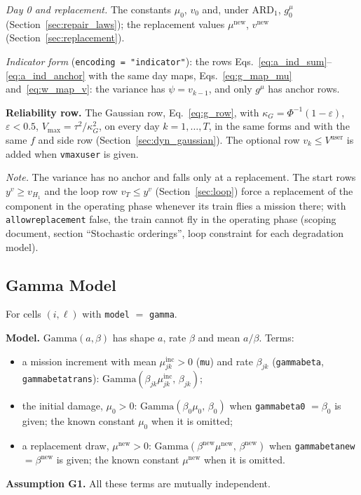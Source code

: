 \documentclass[11pt,a4paper]{article}
\theoremstyle{plain}
\theoremstyle{definition}
\newcommand{\ARDone}{\mathrm{ARD}_{1}}
\newcommand{\inc}{\mathrm{inc}}
\newcommand{\new}{\mathrm{new}}
\renewcommand{\_}{\textunderscore\allowbreak{}}
\begin{document}
\emph{Day 0 and replacement.} The constants $\mu_0$, $v_0$ and, under $\ARDone$,
$g^{\mu}_0$ (Section~\ref{sec:repair_laws}); the replacement values $\mu^{\new}$,
$v^{\new}$ (Section~\ref{sec:replacement}).

\emph{Indicator form} (\texttt{encoding = "indicator"}): the rows
Eqs.~\eqref{eq:a_ind_sum}--\eqref{eq:a_ind_anchor} with the same day maps,
Eqs.~\eqref{eq:g_map_mu} and~\eqref{eq:w_map_v}: the variance has
$\psi = v_{k-1}$, and only $g^{\mu}$ has anchor rows.

\textbf{Reliability row.} The Gaussian row, Eq.~\eqref{eq:g_row}, with
$\kappa_G = \Phi^{-1}(1-\varepsilon)$, $\varepsilon < 0.5$,
$V_{\max} = \tau^2/\kappa_G^2$, on every day $k = 1, \ldots, T$, in the same forms
and with the same $f$ and side row (Section~\ref{sec:dyn_gaussian}). The optional
row $v_k \leq V^{\mathrm{user}}$ is added when \texttt{v\_max\_user} is given.

\emph{Note.} The variance has no anchor and falls only at a replacement. The start rows
$y^v \geq v_{H_1}$ and the loop row $v_T \leq y^v$ (Section~\ref{sec:loop}) force a replacement of the component
in the operating phase whenever its train flies a mission there; with
\texttt{allow\_replacement} false, the train cannot fly in the operating phase
(scoping document, section ``Stochastic orderings'', loop constraint for each
degradation model).

\subsection{Gamma Model}
\label{sec:dyn_gamma}

For cells $(i,\ell)$ with \texttt{model} $=$ \texttt{gamma}.

\textbf{Model.} $\mathrm{Gamma}(a, \beta)$ has shape $a$, rate $\beta$ and mean
$a/\beta$. Terms:
\begin{itemize}[leftmargin=1.5em, nosep]
  \item a mission increment with mean $\mu^{\inc}_{jk} > 0$ (\texttt{mu}) and rate
        $\beta_{jk}$ (\texttt{gamma\_beta}, \texttt{gamma\_beta\_trans}):
        $\mathrm{Gamma}(\beta_{jk}\mu^{\inc}_{jk},\, \beta_{jk})$;
  \item the initial damage, $\mu_0 > 0$: $\mathrm{Gamma}(\beta_0\mu_0,\, \beta_0)$
        when \texttt{gamma\_beta\_0} $= \beta_0$ is given; the known constant
        $\mu_0$ when it is omitted;
  \item a replacement draw, $\mu^{\new} > 0$:
        $\mathrm{Gamma}(\beta^{\new}\mu^{\new},\, \beta^{\new})$ when
        \texttt{gamma\_beta\_new} $= \beta^{\new}$ is given; the known constant
        $\mu^{\new}$ when it is omitted.
\end{itemize}
\textbf{Assumption G1.} All these terms are mutually independent.
\end{document}
